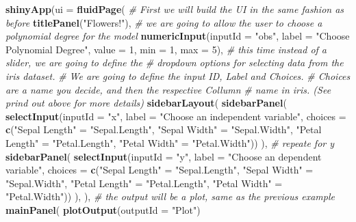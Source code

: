 \documentclass[]{article}
\newenvironment{Shaded}{\begin{snugshade}}{\end{snugshade}}
\newcommand{\CommentTok}[1]{\textcolor[rgb]{0.56,0.35,0.01}{\textit{#1}}}
\newcommand{\DataTypeTok}[1]{\textcolor[rgb]{0.13,0.29,0.53}{#1}}
\newcommand{\DecValTok}[1]{\textcolor[rgb]{0.00,0.00,0.81}{#1}}
\newcommand{\KeywordTok}[1]{\textcolor[rgb]{0.13,0.29,0.53}{\textbf{#1}}}
\newcommand{\NormalTok}[1]{#1}
\newcommand{\StringTok}[1]{\textcolor[rgb]{0.31,0.60,0.02}{#1}}
\begin{document}
\begin{Shaded}
\begin{Highlighting}[]
\KeywordTok{shinyApp}\NormalTok{(}\DataTypeTok{ui =} \KeywordTok{fluidPage}\NormalTok{(}
  \CommentTok{# First we will build the UI in the same fashion as before}
  \KeywordTok{titlePanel}\NormalTok{(}\StringTok{"Flowers!"}\NormalTok{),}
  \CommentTok{# we are going to allow the user to choose a polynomial degree for the model}
  \KeywordTok{numericInput}\NormalTok{(}\DataTypeTok{inputId =} \StringTok{"obs"}\NormalTok{,}
                  \DataTypeTok{label =} \StringTok{"Choose Polynomial Degree"}\NormalTok{,}
                  \DataTypeTok{value =} \DecValTok{1}\NormalTok{, }\DataTypeTok{min =} \DecValTok{1}\NormalTok{, }\DataTypeTok{max =} \DecValTok{5}\NormalTok{),}
  \CommentTok{# this time instead of a slider, we are going to define the }
  \CommentTok{# dropdown options for selecting data from the iris dataset.}
  \CommentTok{# We are going to define the input ID, Label and Choices.}
  \CommentTok{# Choices are a name you decide, and then the respective Collumn }
  \CommentTok{# name in iris. (See prind out above for more details)}
  \KeywordTok{sidebarLayout}\NormalTok{(}
    \KeywordTok{sidebarPanel}\NormalTok{(}
      \KeywordTok{selectInput}\NormalTok{(}\DataTypeTok{inputId =} \StringTok{"x"}\NormalTok{,}
                  \DataTypeTok{label =} \StringTok{"Choose an independent variable"}\NormalTok{,}
                  \DataTypeTok{choices =} \KeywordTok{c}\NormalTok{(}\StringTok{"Sepal Length"}\NormalTok{ =}\StringTok{ "Sepal.Length"}\NormalTok{,}
                              \StringTok{"Sepal Width"}\NormalTok{ =}\StringTok{ "Sepal.Width"}\NormalTok{,}
                              \StringTok{"Petal Length"}\NormalTok{ =}\StringTok{ "Petal.Length"}\NormalTok{,}
                              \StringTok{"Petal Width"}\NormalTok{ =}\StringTok{ "Petal.Width"}\NormalTok{))}
\NormalTok{    ),}
    \CommentTok{# repeate for y}
    \KeywordTok{sidebarPanel}\NormalTok{(}
      \KeywordTok{selectInput}\NormalTok{(}\DataTypeTok{inputId =} \StringTok{"y"}\NormalTok{,}
                  \DataTypeTok{label =} \StringTok{"Choose an dependent variable"}\NormalTok{,}
                  \DataTypeTok{choices =} \KeywordTok{c}\NormalTok{(}\StringTok{"Sepal Length"}\NormalTok{ =}\StringTok{ "Sepal.Length"}\NormalTok{,}
                              \StringTok{"Sepal Width"}\NormalTok{ =}\StringTok{ "Sepal.Width"}\NormalTok{,}
                              \StringTok{"Petal Length"}\NormalTok{ =}\StringTok{ "Petal.Length"}\NormalTok{,}
                              \StringTok{"Petal Width"}\NormalTok{ =}\StringTok{ "Petal.Width"}\NormalTok{))}
\NormalTok{    ),}
\NormalTok{  ),}
  \CommentTok{# the output will be a plot, same as the previous example }
  \KeywordTok{mainPanel}\NormalTok{(}
    \KeywordTok{plotOutput}\NormalTok{(}\DataTypeTok{outputId =} \StringTok{"Plot"}\NormalTok{)}


\end{Highlighting}
\end{Shaded}
\end{document}
